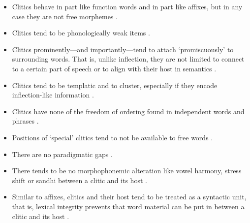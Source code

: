 \begin{itemize}
	\item Clitics behave in part like function words and in part like affixes, 
		but in any case they are not free morphemes 
		\citep[38, 42]{spencerluis2012}.
	\item Clitics tend to be phonologically weak items 
		\citep[39]{spencerluis2012}.
	\item Clitics prominently---and importantly---tend to attach 
		`promiscuously' to surrounding words. That is, unlike inflection, they 
		are not limited to connect to a certain part of speech or to align 
		with their host in semantics \citep[40, 108–109]{spencerluis2012}.
	\item Clitics tend to be templatic and to cluster, especially if they 
		encode inflection-like information \citep[41, 47--48]{spencerluis2012}.
	\item Clitics have none of the freedom of ordering found in independent 
		words and phrases \citep[43]{spencerluis2012}.
	\item Positions of `special' clitics tend to not be available to free 
		words \citep[44]{spencerluis2012}.
	\item There are no paradigmatic gaps \citep[108--109]{spencerluis2012}.
	\item There tends to be no morphophonemic alteration like vowel harmony, 
		stress shift or sandhi between a clitic and its host 
		\citep[108--109]{spencerluis2012}.
	\item Similar to affixes, clitics and their host tend to be treated as a 
		syntactic unit, that is, lexical integrity prevents that word material
		can be put in between a clitic and its host 
		\citep[108, 110]{spencerluis2012}.
\end{itemize}

